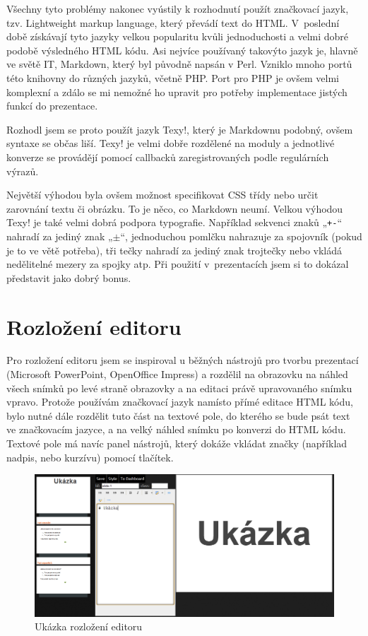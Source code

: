 \documentclass[11pt,twoside,a4paper]{book}
\begin{document}
Všechny tyto problémy nakonec vyústily k rozhodnutí použít značkovací jazyk, tzv. Lightweight markup language, který
převádí text do HTML. V~poslední době získávají tyto jazyky velkou popularitu kvůli jednoduchosti a velmi dobré podobě
výsledného HTML kódu. Asi nejvíce používaný takovýto jazyk je, hlavně ve světě IT, Markdown, který byl původně napsán v
Perl. Vzniklo mnoho portů této knihovny do různých jazyků, včetně PHP. Port pro PHP je ovšem velmi komplexní a zdálo se
mi nemožné ho upravit pro potřeby implementace jistých funkcí do prezentace.

Rozhodl jsem se proto použít jazyk Texy!, který je Markdownu podobný, ovšem syntaxe se občas liší. Texy! je velmi dobře
rozdělené na moduly a jednotlivé konverze se provádějí pomocí callbacků zaregistrovaných podle regulárních výrazů.

Největší výhodou byla ovšem možnost specifikovat CSS třídy nebo určit zarovnání textu či obrázku. To je něco, co Markdown neumí. Velkou výhodou Texy! je také velmi dobrá podpora typografie. Například sekvenci znaků „\lstinline|+-|“ nahradí za jediný znak „$\pm$“, jednoduchou pomlčku nahrazuje za spojovník (pokud je to ve větě potřeba), tři tečky nahradí za jediný znak trojtečky nebo vkládá nedělitelné mezery za spojky atp. Při použití v~prezentacích jsem si to dokázal představit jako dobrý bonus.


\section{Rozložení editoru}
Pro rozložení editoru jsem se inspiroval u běžných nástrojů pro tvorbu prezentací (Microsoft PowerPoint, OpenOffice
Impress) a rozdělil na obrazovku na náhled všech snímků po levé straně obrazovky a na editaci právě upravovaného snímku
vpravo. Protože používám značkovací jazyk namísto přímé editace HTML kódu, bylo nutné dále rozdělit tuto část na
textové pole, do kterého se bude psát text ve značkovacím jazyce, a na velký náhled snímku po konverzi do HTML kódu.
Textové pole má navíc panel nástrojů, který dokáže vkládat značky (například nadpis, nebo kurzívu) pomocí tlačítek.

\begin{figure}[ht]
	\begin{center}
		\includegraphics[width=14cm]{PRO-img/editor.png}
		\caption{Ukázka rozložení editoru}
		\label{fig:editorLayout}
	\end{center}
\end{figure}
\end{document}
